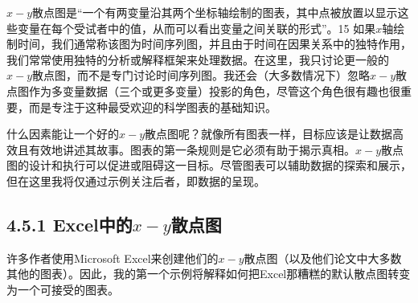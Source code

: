 $x-y$散点图是“一个有两变量沿其两个坐标轴绘制的图表，其中点被放置以显示这些变量在每个受试者中的值，从而可以看出变量之间关联的形式”。15 如果$x$轴绘制时间，我们通常称该图为时间序列图，并且由于时间在因果关系中的独特作用，我们常常使用独特的分析或解释框架来处理数据。在这里，我只讨论更一般的$x-y$散点图，而不是专门讨论时间序列图。我还会（大多数情况下）忽略$x-y$散点图作为多变量数据（三个或更多变量）投影的角色，尽管这个角色很有趣也很重要，而是专注于这种最受欢迎的科学图表的基础知识。

什么因素能让一个好的$x-y$散点图呢？就像所有图表一样，目标应该是让数据高效且有效地讲述其故事。图表的第一条规则是它必须有助于揭示真相。$x-y$散点图的设计和执行可以促进或阻碍这一目标。尽管图表可以辅助数据的探索和展示，但在这里我将仅通过示例关注后者，即数据的呈现。

\subsection*{4.5.1 Excel中的$x-y$散点图}
许多作者使用Microsoft Excel来创建他们的$x-y$散点图（以及他们论文中大多数其他的图表）。因此，我的第一个示例将解释如何把Excel那糟糕的默认散点图转变为一个可接受的图表。

